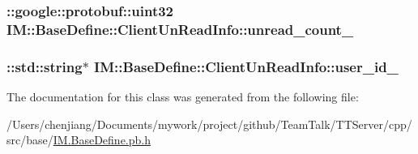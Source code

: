 \subsubsection[{unread\+\_\+count\+\_\+}]{\setlength{\rightskip}{0pt plus 5cm}\+::google\+::protobuf\+::uint32 I\+M\+::\+Base\+Define\+::\+Client\+Un\+Read\+Info\+::unread\+\_\+count\+\_\+\hspace{0.3cm}{\ttfamily [private]}}\label{class_i_m_1_1_base_define_1_1_client_un_read_info_aaf11ec21ef69d622a78c39b8a98afb5f}
\hypertarget{class_i_m_1_1_base_define_1_1_client_un_read_info_ae50d67d8761fbe558ecba1339cf54f2f}{}
\subsubsection[{user\+\_\+id\+\_\+}]{\setlength{\rightskip}{0pt plus 5cm}\+::std\+::string$\ast$ I\+M\+::\+Base\+Define\+::\+Client\+Un\+Read\+Info\+::user\+\_\+id\+\_\+\hspace{0.3cm}{\ttfamily [private]}}\label{class_i_m_1_1_base_define_1_1_client_un_read_info_ae50d67d8761fbe558ecba1339cf54f2f}


The documentation for this class was generated from the following file\+:\begin{DoxyCompactItemize}
\item 
/\+Users/chenjiang/\+Documents/mywork/project/github/\+Team\+Talk/\+T\+T\+Server/cpp/src/base/\hyperlink{_i_m_8_base_define_8pb_8h}{I\+M.\+Base\+Define.\+pb.\+h}\end{DoxyCompactItemize}
